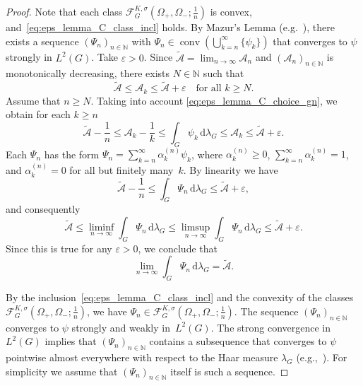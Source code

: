 \documentclass[[a4paper,english,12pt]{amsart}
\theoremstyle{plain}
\theoremstyle{remark}
\newcommand{\conv}{\mathop{\mathrm{conv}}}
\newcommand{\NN}{\mathbb N}
\begin{document}
\begin{proof}
Note that each class $\mathcal{F}^{K,\sigma}_G \left( \Omega_+, \Omega_-; \frac{1}{n} \right)$ is convex, and~\eqref{eq:eps_lemma_C_class_incl} holds.
By Mazur's Lemma (e.g.~\cite[Corollary 3.8, Exercise 3.4]{Brezis}), there exists a sequence $(\Psi_n)_{n \in \NN}$ with $\Psi_n \in \conv{ \left( \bigcup_{k=n}^\infty \{\psi_k\} \right) }$ that converges to $\psi$ strongly in $L^2(G)$.  Take $\varepsilon > 0$. Since $\widetilde{\mathcal{A}} = \lim_{n \to \infty} \mathcal{A}_n$ and $(\mathcal{A}_n)_{n \in \NN}$ is monotonically decreasing, there exists $N \in \NN$ such that
$$
\widetilde{\mathcal{A}} \le \mathcal{A}_k \le \widetilde{\mathcal{A}} + \varepsilon \quad \text{for all } k \ge N.
$$
Assume that  $n \ge N$. Taking into account \eqref{eq:eps_lemma_C_choice_gn}, we obtain for each $k \ge n$
$$
\widetilde{\mathcal{A}} - \frac{1}{n} \le \mathcal{A}_k - \frac{1}{k} \le \int_G  \psi_k \,\mbox{d}\lambda_G  \le \mathcal{A}_k \le \widetilde{\mathcal{A}} + \varepsilon.
$$
Each $\Psi_n$ has the form $\Psi_n = \sum_{k =n}^\infty \alpha_k^{(n)} \psi_k$, where $\alpha_k^{(n)} \ge 0$, $\sum_{k =n}^\infty \alpha_k^{(n)} = 1$, and $\alpha_k^{(n)} = 0$ for all but finitely many~$k$. By linearity we have
$$
\widetilde{\mathcal{A}} - \frac{1}{n} \le \int_G \Psi_n \,\mbox{d}\lambda_G \le \widetilde{\mathcal{A}} + \varepsilon,
$$
and consequently
$$
\widetilde{\mathcal{A}} 
\le \liminf_{n \to \infty} \int_G  \Psi_n \,\mbox{d}\lambda_G 
\le \limsup_{n \to \infty} \int_G  \Psi_n \,\mbox{d}\lambda_G
\le \widetilde{\mathcal{A}} + \varepsilon.
$$
Since this is true for any $\varepsilon > 0$, we conclude that
$$
\lim_{n \to \infty} \int_G  \Psi_n \,\mbox{d}\lambda_G = \widetilde{\mathcal{A}}.
$$

By the inclusion~\eqref{eq:eps_lemma_C_class_incl} and the convexity of the classes $\mathcal{F}^{K,\sigma}_G \left( \Omega_+, \Omega_-; \frac{1}{n} \right)$, we have $\Psi_n \in \mathcal{F}^{K,\sigma}_G \left( \Omega_+, \Omega_-; \frac{1}{n} \right)$. The sequence $(\Psi_n)_{n \in \NN}$ converges to $\psi$ strongly and weakly in~$L^2(G)$. The strong convergence in $L^2(G)$ implies that $(\Psi_n)_{n \in \NN}$ contains a subsequence that converges to $\psi$ pointwise almost everywhere with respect to the Haar measure $\lambda_G$ (e.g.,~\cite[Theorem~4.9]{Brezis}). For simplicity we assume that $(\Psi_n)_{n \in \NN}$ itself is such a sequence.


\end{proof}
\end{document}
